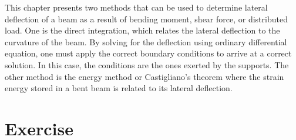 \documentclass[
10pt,
a4paper,
openany,
svgnames,
]{book} %
\begin{document}
This chapter presents two methods that can be used to determine lateral deflection of a beam as a result of bending moment, shear force, or distributed load. One is the direct integration, which relates the lateral deflection to the curvature of the beam. By solving for the deflection using ordinary differential equation, one must apply the correct boundary conditions to arrive at a correct solution. In this case, the conditions are the ones exerted by the supports. The other method is the energy method or Castigliano’s theorem where the strain energy stored in a bent beam is related to its lateral deflection.

\section*{Exercise}
\end{document}
